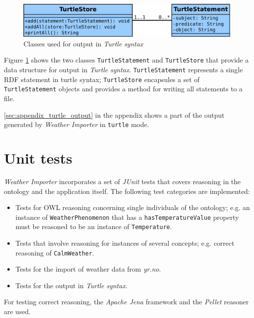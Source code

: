\begin{figure}
\centering
\includegraphics[width=.7\textwidth]{figures/diagrams/turtlestore.png}
\caption{Classes used for output in \emph{Turtle syntax}}
\label{fig:importer_turtlestore}
\end{figure}

Figure \ref{fig:importer_turtlestore} shows the two classes \texttt{TurtleStatement} and \texttt{TurtleStore} that provide a data structure for output in \emph{Turtle syntax}. \texttt{TurtleStatement} represents a single RDF statement in turtle syntax; \texttt{TurtleStore} encapsules a set of \texttt{TurtleStatement} objects and provides a method for writing all statements to a file.

\ref{sec:appendix_turtle_output} in the appendix shows a part of the output generated by \emph{Weather Importer} in \texttt{turtle} mode.

\section{Unit tests}
\label{sec:importer_tests}

\emph{Weather Importer} incorporates a set of \emph{JUnit} tests that covers reasoning in the \thinkhomeweather ontology and the application itself. The following test categories are implemented:
\begin{itemize}
  \item Tests for OWL reasoning concerning single individuals of the ontology; e.g. an instance of \texttt{WeatherPhenomenon} that has a \texttt{hasTemperatureValue} property must be reasoned to be an instance of \texttt{Temperature}.
  \item Tests that involve reasoning for instances of several concepts; e.g. correct reasoning of \texttt{CalmWeather}.
  \item Tests for the import of weather data from \emph{yr.no}.
  \item Tests for the output in \emph{Turtle syntax}.
\end{itemize}


For testing correct reasoning, the \emph{Apache Jena} framework and the \emph{Pellet} reasoner are used.
